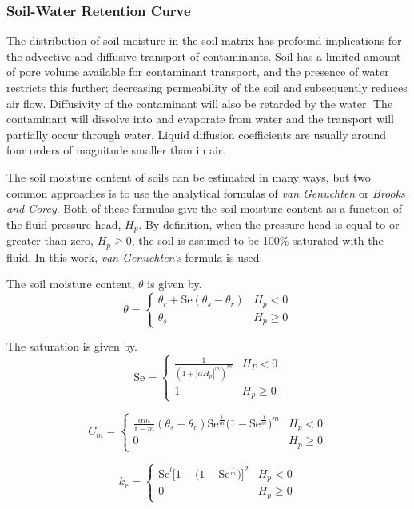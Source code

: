 \subsubsection{Soil-Water Retention Curve}

The distribution of soil moisture in the soil matrix has profound implications for the advective and diffusive transport of contaminants.
Soil has a limited amount of pore volume available for contaminant transport, and the presence of water restricts this further; decreasing permeability of the soil and subsequently reduces air flow.
Diffusivity of the contaminant will also be retarded by the water.
The contaminant will dissolve into and evaporate from water and the transport will partially occur through water.
Liquid diffusion coefficients are usually around four orders of magnitude smaller than in air.

The soil moisture content of soils can be estimated in many ways, but two common approaches is to use the analytical formulas of \textit{van Genuchten} or \textit{Brooks and Corey}.
Both of these formulas give the soil moisture content as a function of the fluid pressure head, $H_p$.
By definition, when the pressure head is equal to or greater than zero, $H_p \geq 0$, the soil is assumed to be 100\% saturated with the fluid.
In this work, \textit{van Genuchten's} formula is used.

The soil moisture content, $\theta$ is given by.
\begin{equation}
  \theta = \begin{cases}
    \theta_r + \mathrm{Se}(\theta_s - \theta_r) & H_p < 0 \\
    \theta_s & H_p \geq 0
\end{cases}
\end{equation}

The saturation is given by.
\begin{equation}
  \mathrm{Se} = \begin{cases}
    \frac{1}{(1 + |\alpha H_p|^m)^m} & H_P < 0 \\
    1 & H_p \geq 0
  \end{cases}
\end{equation}

\begin{equation}
  C_m = \begin{cases}
    \frac{\alpha m}{1-m}(\theta_s - \theta_r)\mathrm{Se}^{\frac{1}{m}}\big( 1 - \mathrm{Se}^{\frac{1}{m}} \big)^m & H_p < 0 \\
    0 & H_p \geq 0
  \end{cases}
\end{equation}

\begin{equation}
  k_r = \begin{cases}
    \mathrm{Se}^l \big[ 1 - \big( 1 - \mathrm{Se}^\frac{1}{m} \big) \big]^2 & H_p < 0 \\
    0 & H_p \geq 0
  \end{cases}
\end{equation}
